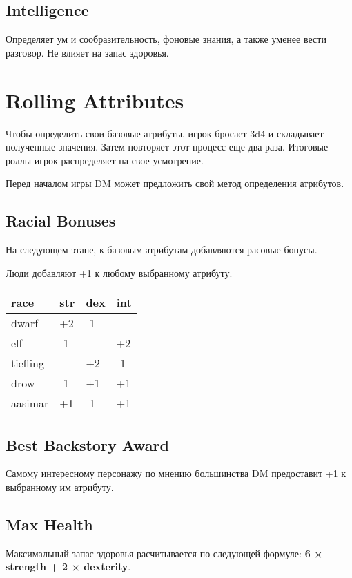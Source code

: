 \documentclass[a5paper,11pt]{book}
\begin{document}
\begin{multicols}{2}
\subsection{Intelligence}
Определяет ум и сообразительность, фоновые знания, а также уменее вести разговор. Не влияет на запас здоровья.

\section{Rolling Attributes}
Чтобы определить свои базовые атрибуты, игрок бросает 3d4 и складывает полученные значения. Затем повторяет этот процесс еще два раза. Итоговые роллы игрок распределяет на свое усмотрение.

Перед началом игры DM может предложить свой метод определения атрибутов.

\subsection{Racial Bonuses}
На следующем этапе, к базовым атрибутам добавляются расовые бонусы.

Люди добавляют +1 к любому выбранному атрибуту.

\smallskip
\noindent
{}
\setlength\tabcolsep{0pt}
\begin{tabularx}{\linewidth}{@{}ZYYY@{}}
  \textbf{race} & \textbf{str} & \textbf{dex} & \textbf{int} \\
  \hline
  dwarf     & +2 & -1 &    \\
  elf       & -1 &    & +2 \\
  tiefling  &    & +2 & -1 \\
  drow      & -1 & +1 & +1 \\
  aasimar   & +1 & -1 & +1
\end{tabularx}

\subsection{Best Backstory Award}
Самому интересному персонажу по мнению большинства DM предоставит +1 к выбранному им атрибуту.

\subsection{Max Health}

Максимальный запас здоровья расчитывается по следующей формуле: \textbf{6 × strength + 2 × dexterity}.


\end{multicols}
\end{document}
